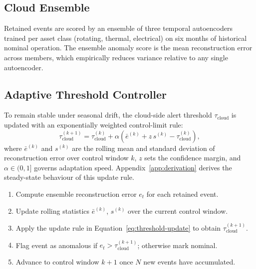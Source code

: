 \subsection{Cloud Ensemble}
Retained events are scored by an ensemble of three temporal autoencoders trained per asset
class (rotating, thermal, electrical) on six months of historical nominal operation. The
ensemble anomaly score is the mean reconstruction error across members, which empirically
reduces variance relative to any single autoencoder.

\subsection{Adaptive Threshold Controller}
\label{sec:adaptive-threshold}
To remain stable under seasonal drift, the cloud-side alert threshold $\tau_{\text{cloud}}$ is
updated with an exponentially weighted control-limit rule:
\begin{equation}
\tau_{\text{cloud}}^{(k+1)} = \tau_{\text{cloud}}^{(k)} + \alpha \left( \bar{e}^{(k)} + z\, s^{(k)} - \tau_{\text{cloud}}^{(k)} \right),
\label{eq:threshold-update}
\end{equation}
where $\bar{e}^{(k)}$ and $s^{(k)}$ are the rolling mean and standard deviation of
reconstruction error over control window $k$, $z$ sets the confidence margin, and
$\alpha \in (0,1]$ governs adaptation speed. Appendix~\ref{app:derivation} derives the
steady-state behaviour of this update rule.

\begin{tcolorbox}[colback=usydcream,colframe=usydmaroon,title={Algorithm 3.1: Streaming Threshold Update},
  fonttitle=\bfseries,colbacktitle=usydmaroon]
\begin{enumerate}[leftmargin=1.4cm,label=\arabic*.]
  \item Compute ensemble reconstruction error $e_t$ for each retained event.
  \item Update rolling statistics $\bar{e}^{(k)}$, $s^{(k)}$ over the current control window.
  \item Apply the update rule in Equation~\eqref{eq:threshold-update} to obtain $\tau_{\text{cloud}}^{(k+1)}$.
  \item Flag event as anomalous if $e_t > \tau_{\text{cloud}}^{(k+1)}$; otherwise mark nominal.
  \item Advance to control window $k{+}1$ once $N$ new events have accumulated.
\end{enumerate}
\end{tcolorbox}
